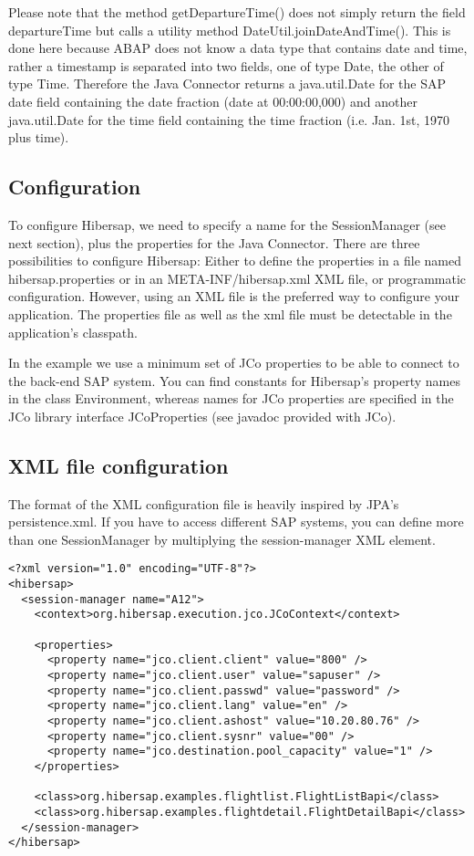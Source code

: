 Please note that the method getDepartureTime() does not simply return the field departureTime
but calls a utility method DateUtil.joinDateAndTime(). This is done here because ABAP does not know a
data type that contains date and time, rather a timestamp is separated into two fields, one
of type Date, the other of type Time. Therefore the Java Connector returns a java.util.Date for the SAP
date field containing the date fraction (date at 00:00:00,000) and another java.util.Date for the time
field containing the time fraction (i.e. Jan. 1st, 1970 plus time).


\subsection{Configuration}

To configure Hibersap, we need to specify a name for the SessionManager (see next section),
plus the properties for the Java Connector.
There are three possibilities to configure Hibersap: Either to define the properties in a file named hibersap.properties
or in an META-INF/hibersap.xml XML file, or programmatic configuration. 
However, using an XML file is the preferred way to configure your application.
The properties file as well as the xml file must be detectable in the application's classpath. 

In the example we use a minimum set of JCo properties to be able to connect to the back-end SAP system.
You can find constants for Hibersap's property names in the class Environment,
whereas names for JCo properties are specified in the JCo library interface JCoProperties (see javadoc provided with
JCo).


\subsection{XML file configuration}

The format of the XML configuration file is heavily inspired by JPA's persistence.xml.
If you have to access different SAP systems, you can define more than one SessionManager by multiplying the
session-manager XML element.

\begin{Verbatim}[frame=single,label=hibersap.xml]
<?xml version="1.0" encoding="UTF-8"?>
<hibersap>
  <session-manager name="A12">
    <context>org.hibersap.execution.jco.JCoContext</context>

    <properties>
      <property name="jco.client.client" value="800" />
      <property name="jco.client.user" value="sapuser" />
      <property name="jco.client.passwd" value="password" />
      <property name="jco.client.lang" value="en" />
      <property name="jco.client.ashost" value="10.20.80.76" />
      <property name="jco.client.sysnr" value="00" />
      <property name="jco.destination.pool_capacity" value="1" />
    </properties>

    <class>org.hibersap.examples.flightlist.FlightListBapi</class>
    <class>org.hibersap.examples.flightdetail.FlightDetailBapi</class>
  </session-manager>
</hibersap>
\end{Verbatim}


